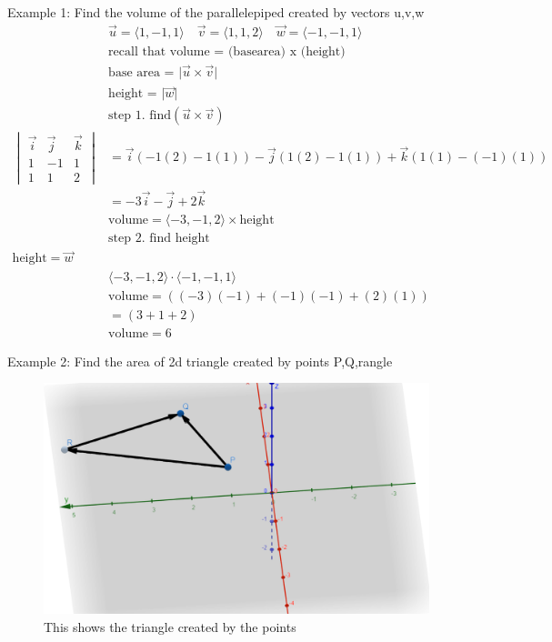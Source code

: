 \documentclass{article}
\newcommand{\abs}[1]{\lvert#1\rvert} %
\newcommand{\vecgen}[3]{\langle #1, #2, #3 \rangle} %
\begin{document}
Example 1: Find the volume of the parallelepiped created by vectors u,v,w
\begin{align*}
    &\vec{u} = \vecgen{1}{-1}{1} \quad
    \vec{v} = \vecgen{1}{1}{2} \quad
    \vec{w} = \vecgen{-1}{-1}{1} \\
    &\text{recall that volume = (basearea) x (height)}\\
    &\text{base area = } \abs{\vec{u} \times \vec{v}} \\
    &\text{height = } \abs{\vec{w}} \\
    &\text{step 1. find} (\vec{u} \times \vec{v})\\
    \begin{vmatrix}
        \vec{i} & \vec{j} & \vec{k} \\
        1 & -1 & 1 \\
        1 & 1 & 2
    \end{vmatrix}
    &= \vec{i}(-1(2) - 1(1)) - \vec{j}(1(2) - 1(1)) + \vec{k}(1(1) - (-1)(1)) \\
    &= -3\vec{i} - \vec{j} + 2\vec{k} \\
    &\text{volume} = \vecgen{-3}{-1}{2} \times \text{height}\\
    &\text{step 2. find height}\\
    \text{height} = \vec{w}\\
    &\vecgen{-3}{-1}{2} \cdot \vecgen{-1}{-1}{1}\\
    &\text{volume} = ((-3)(-1)+(-1)(-1)+(2)(1)) \\
    &=(3+1+2)\\
    &\text{volume} = 6
\end{align*}

Example 2: Find the area of 2d triangle created by points P,Q,rangle
\begin{figure}[H]
    \includegraphics[scale=.5,trim=0 0 0 0]{triangle.png} %
    \caption{This shows the triangle created by the points}
\end{figure}
\end{document}
